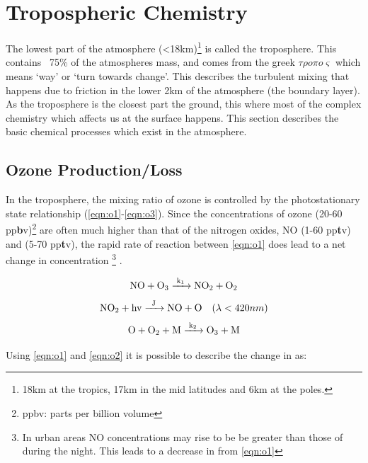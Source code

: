 \citep{failparis}



\section{Tropospheric Chemistry}

The lowest part of the atmosphere (<18km)\footnote{18km at the tropics, 17km in the mid latitudes and 6km at the poles. } is called the troposphere. This contains ~75\% of the atmospheres mass, and comes from the greek $\tau\rho o \pi o \varsigma$ which means `way' or `turn towards change'. This describes the turbulent mixing that happens due to friction in the lower 2km of the atmosphere (the boundary layer). As the troposphere is the closest part the ground, this where most of the complex chemistry which affects us at the surface happens. This section describes the basic chemical processes which exist in the atmosphere.




\subsection{Ozone Production/Loss}\label{sec:o3prod}
In the troposphere, the mixing ratio of ozone is controlled by the photostationary state relationship (\autoref{eqn:o1}-\ref{eqn:o3}).
Since the concentrations of ozone (20-60 pp\textbf{b}v)\footnote{ppbv: parts per billion volume} are often much higher than that of the nitrogen oxides, NO (1-60 pp\textbf{t}v) and  (5-70 pp\textbf{t}v), the rapid rate of reaction between \autoref{eqn:o1} does lead to a net change in  concentration \footnote{In urban areas NO concentrations may rise to be be greater than those of  during the night. This leads to a decrease in from \autoref{eqn:o1}} \citep{fundamentals}.



\begin{equation}
  \centering
\ce{NO + O3 ->[k1] NO2 +O2} \label{eqn:o1}
\end{equation}
\begin{equation}
  \centering
 \ce{NO2 + hv ->[J] NO + O }\ \ \ (\lambda < 420nm) \label{eqn:o2}
\end{equation}
 \begin{equation}
   \centering
\ce{O + O2 + M ->[k2] O3 + M}\label{eqn:o3}
\end{equation}

Using \autoref{eqn:o1} and \autoref{eqn:o2} it is possible to describe the change in  as:

